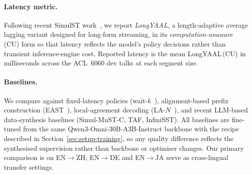 \paragraph{Latency metric.} Following recent SimulST
work~\citep{papi2023longyaal}, we report \emph{LongYAAL}, a
length-adaptive average lagging variant designed for long-form streaming,
in its \emph{computation-unaware} (CU) form so that latency reflects the
model's policy decisions rather than transient inference-engine cost.
Reported latency is the mean LongYAAL\,(CU) in milliseconds across the
ACL~6060 dev talks at each segment size.

\paragraph{Baselines.} We compare against fixed-latency policies
(wait-$k$~\citep{ma2019stacl}), alignment-based prefix construction
(EAST~\citep{EAST}), local-agreement decoding
(LA-$N$~\citep{liu2020low}), and recent LLM-based data-synthesis baselines
(Simul-MuST-C, TAF, InfiniSST). All baselines are fine-tuned from the same
Qwen3-Omni-30B-A3B-Instruct backbone with the recipe described in
Section~\ref{sec:setup-training}, so any quality difference reflects the
synthesised supervision rather than backbone or optimiser changes. Our
primary comparison is on EN$\rightarrow$ZH; EN$\rightarrow$DE and
EN$\rightarrow$JA serve as cross-lingual transfer settings.
